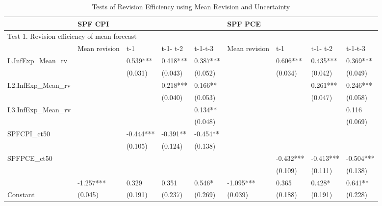 \documentclass[]{article}
\begin{document}
\begin{table}[ht]
	\caption{Tests of Revision Efficiency using Mean Revision and Uncertainty}
	\label{RevEfficency}
\begin{adjustbox}{angle=90}
	
	\begin{tabular}{lllllllll}
		\hline 
		& \multicolumn{4}{l}{SPF CPI}                     & \multicolumn{4}{l}{SPF PCE}                       \\
		\hline 
		\multicolumn{9}{l}{Test 1.  Revision efficiency of mean forecast}            \\
	                                            \hline 
		& Mean revision & t-1       & t-1- t-2 & t-1-t-3  & Mean revision & t-1       & t-1- t-2  & t-1-t-3   \\
		\hline 
		L.InfExp\_Mean\_rv  &               & 0.539***  & 0.418*** & 0.387*** &               & 0.606***  & 0.435***  & 0.369***  \\
		&               & (0.031)   & (0.043)  & (0.052)  &               & (0.034)   & (0.042)   & (0.049)   \\
		L2.InfExp\_Mean\_rv &               &           & 0.218*** & 0.166**  &               &           & 0.261***  & 0.246***  \\
		&               &           & (0.040)  & (0.053)  &               &           & (0.047)   & (0.058)   \\
		L3.InfExp\_Mean\_rv &               &           &          & 0.134**  &               &           &           & 0.116     \\
		&               &           &          & (0.048)  &               &           &           & (0.069)   \\
		SPFCPI\_ct50        &               & -0.444*** & -0.391** & -0.454** &               &           &           &           \\
		&               & (0.105)   & (0.124)  & (0.138)  &               &           &           &           \\
		SPFPCE\_ct50        &               &           &          &          &               & -0.432*** & -0.413*** & -0.504*** \\
		&               &           &          &          &               & (0.109)   & (0.111)   & (0.138)   \\
		& -1.257***     & 0.329     & 0.351    & 0.546*   & -1.095***     & 0.365     & 0.428*    & 0.641**   \\
		Constant & (0.045)       & (0.191)   & (0.237)  & (0.269)  & (0.039)       & (0.188)   & (0.191)   & (0.228)   \\

\end{tabular}
\end{adjustbox}
\end{table}
\end{document}
